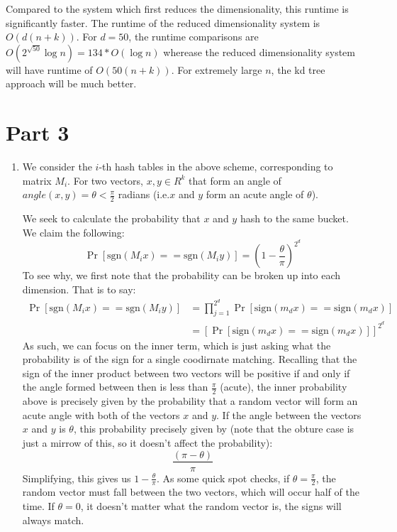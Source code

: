 \documentclass[12pt]{article}
\begin{document}
\begin{enumerate}[label=(\alph*)]
    Compared to the system which first reduces the dimensionality, this runtime is significantly faster. The runtime of the reduced dimensionality system is $O(d(n + k))$. For $d = 50$, the runtime comparisons are $O(2^{\sqrt{50}} \log n) = 134*O(\log n)$ wherease the reduced dimensionality system will have runtime of $O(50(n + k))$. For extremely large $n$, the kd tree approach will be much better.
\end{enumerate}


\newpage
\section*{Part 3}

\begin{enumerate}[label=(\alph*)]
  \item
    We consider the $i$-th hash tables in the above scheme, corresponding to matrix $M_i$. For two vectors, $x,y \in R^{k}$ that form an angle of $angle(x,y) = \theta < \frac{\pi}{2}$ radians (i.e.$x$ and $y$ form an acute angle of $\theta$).

    We seek to calculate the probability that $x$ and $y$ hash to the same bucket. We claim the following:
    \[
      \Pr[\text{sgn}(M_ix) == \text{sgn}(M_iy)] = \left(1 -\frac{\theta}{\pi}\right)^{2^d}
    \]
    To see why, we first note that the probability can be broken up into each dimension. That is to say:
    \begin{align*}
      \Pr[\text{sgn}(M_ix) == \text{sgn}(M_iy)] &= \prod_{j=1}^{2^d} \Pr[\text{sign}(m_d x) == \text{sign}(m_dx)] \tag{All coordinates need to have the same sign} \\
      &= \left[\Pr[\text{sign}(m_d x) == \text{sign}(m_dx)]\right]^{2^d} \tag{Each $m_d$ is iid}
    \end{align*}
    As such, we can focus on the inner term, which is just asking what the probability is of the sign for a single coodirnate matching. Recalling that the sign of the inner product between two vectors will be positive if and only if the angle formed between then is less than $\frac{\pi}{2}$ (acute), the inner probability above is precisely given by the probability that a random vector will form an acute angle with both of the vectors $x$ and $y$. If the angle between the vectors $x$ and $y$ is $\theta$, this probability precisely given by (note that the obture case is just a mirrow of this, so it doesn't affect the probability):
    \[
      \frac{(\pi - \theta)}{\pi}
    \]
    Simplifying, this gives us $1 - \frac{\theta}{\pi}$. As some quick spot checks, if $\theta = \frac{\pi}{2}$, the random vector must fall between the two vectors, which will occur half of the time. If $\theta = 0$, it doesn't matter what the random vector is, the signs will always match. 


\end{enumerate}
\end{document}
